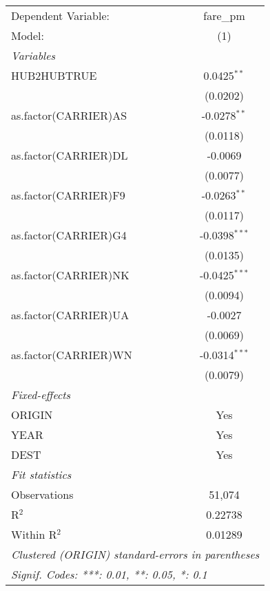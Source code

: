 \begin{table}
    \begin{tabular}{lc}
       \tabularnewline \midrule \midrule
       Dependent Variable:  & fare\_pm\\   
       Model:               & (1)\\  
       \midrule
       \emph{Variables}\\
       HUB2HUBTRUE          & 0.0425$^{**}$\\   
                            & (0.0202)\\   
       as.factor(CARRIER)AS & -0.0278$^{**}$\\   
                            & (0.0118)\\   
       as.factor(CARRIER)DL & -0.0069\\   
                            & (0.0077)\\   
       as.factor(CARRIER)F9 & -0.0263$^{**}$\\   
                            & (0.0117)\\   
       as.factor(CARRIER)G4 & -0.0398$^{***}$\\   
                            & (0.0135)\\   
       as.factor(CARRIER)NK & -0.0425$^{***}$\\   
                            & (0.0094)\\   
       as.factor(CARRIER)UA & -0.0027\\   
                            & (0.0069)\\   
       as.factor(CARRIER)WN & -0.0314$^{***}$\\   
                            & (0.0079)\\   
       \midrule
       \emph{Fixed-effects}\\
       ORIGIN               & Yes\\  
       YEAR                 & Yes\\  
       DEST                 & Yes\\  
       \midrule
       \emph{Fit statistics}\\
       Observations         & 51,074\\  
       R$^2$                & 0.22738\\  
       Within R$^2$         & 0.01289\\  
       \midrule \midrule
       \multicolumn{2}{l}{\emph{Clustered (ORIGIN) standard-errors in parentheses}}\\
       \multicolumn{2}{l}{\emph{Signif. Codes: ***: 0.01, **: 0.05, *: 0.1}}\\
    \end{tabular}
    \end{table}